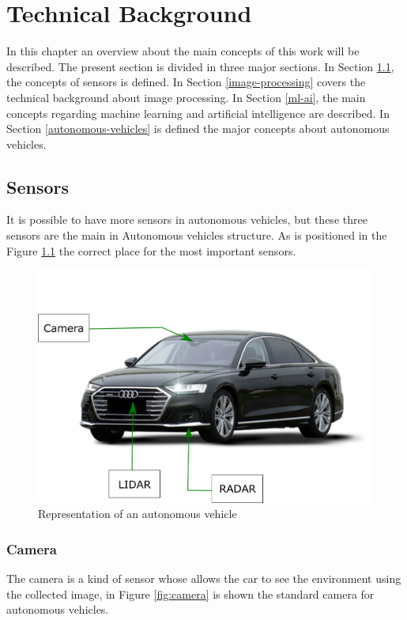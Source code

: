 \chapter{Technical Background}
\label{capitulo3}

In this chapter an overview about the main concepts of this work will be described. The present section is divided in three major sections. In Section \ref{sensors}, the concepts of sensors is defined. In Section \ref{image-processing} covers the technical background about image processing. In Section \ref{ml-ai}, the main concepts regarding machine learning and artificial intelligence are described. In Section \ref{autonomous-vehicles} is defined the major concepts about autonomous vehicles.

\section{Sensors}\label{sensors}

It is possible to have more sensors in autonomous vehicles, but these three sensors are the main in Autonomous vehicles structure. As is positioned in the Figure \ref{fig:autonomous-vehicles} the correct place for the most important sensors.


\begin{figure}[H]
\centering
\includegraphics[scale=0.7]{imagens/image823.png}
\caption{Representation of an autonomous vehicle}
\label{fig:autonomous-vehicles}
\end{figure}


\subsection{Camera}
The camera is a kind of sensor whose allows the car to see the environment using the collected image, in Figure \ref{fig:camera} is shown the standard camera for autonomous vehicles. 

